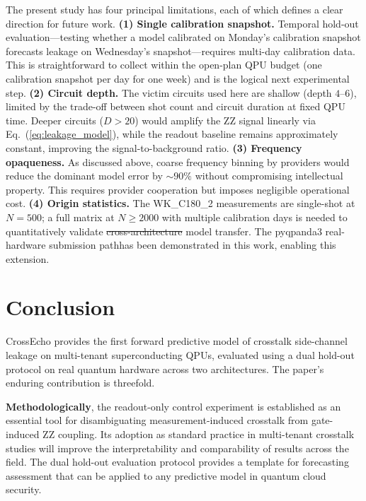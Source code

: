 \documentclass[ASNA,twocolumn]{USG}
\providecommand{\DIFaddtex}[1]{{\protect\color{blue}\uwave{#1}}} %
\providecommand{\DIFdeltex}[1]{{\protect\color{red}\sout{#1}}}                      %
\providecommand{\DIFaddbegin}{} %
\providecommand{\DIFaddend}{} %
\providecommand{\DIFdelbegin}{} %
\providecommand{\DIFdelend}{} %
\providecommand{\DIFadd}[1]{\texorpdfstring{\DIFaddtex{#1}}{#1}} %
\providecommand{\DIFdel}[1]{\texorpdfstring{\DIFdeltex{#1}}{}} %
\begin{document}
The present study has four principal limitations, each of which defines a clear direction for future work. \textbf{(1) Single calibration snapshot.} Temporal hold-out evaluation---testing whether a model calibrated on Monday's calibration snapshot forecasts leakage on Wednesday's snapshot---requires multi-day calibration data. This is straightforward to collect within the open-plan QPU budget (one calibration snapshot per day for one week) and is the logical next experimental step. \textbf{(2) Circuit depth.} The victim circuits used here are shallow (depth $4$--$6$), limited by the trade-off between shot count and circuit duration at fixed QPU time. Deeper circuits ($D > 20$) would amplify the ZZ signal linearly via Eq.~(\ref{eq:leakage_model}), while the readout baseline remains approximately constant, improving the signal-to-background ratio. \textbf{(3) Frequency opaqueness.} As discussed above, coarse frequency binning by providers would reduce the dominant model error by $\sim 90\%$ without compromising intellectual property. This requires provider cooperation but imposes negligible operational cost. \textbf{(4) Origin statistics.} The WK\_C180\_2 measurements are single-shot at $N = 500$; a full matrix at $N \geq 2000$ with multiple calibration days is needed to quantitatively validate \DIFdelbegin \DIFdel{cross-architecture }\DIFdelend \DIFaddbegin \DIFadd{cross-processor-architecture }\DIFaddend model transfer. The pyqpanda3 real-hardware submission path\DIFaddbegin \DIFadd{~\mbox{%
\cite{pyqpanda3} }\hskip0pt%
}\DIFaddend has been demonstrated in this work, enabling this extension.

\section{Conclusion}
\label{sec:conclusion}

CrossEcho provides the first forward predictive model of crosstalk side-channel leakage on multi-tenant superconducting QPUs, evaluated using a dual hold-out protocol on real quantum hardware across two architectures. The paper's enduring contribution is threefold.

\textbf{Methodologically}, the readout-only control experiment is established as an essential tool for disambiguating measurement-induced crosstalk from gate-induced ZZ coupling. Its adoption as standard practice in multi-tenant crosstalk studies will improve the interpretability and comparability of results across the field. The dual hold-out evaluation protocol provides a template for forecasting assessment that can be applied to any predictive model in quantum cloud security.
\end{document}
